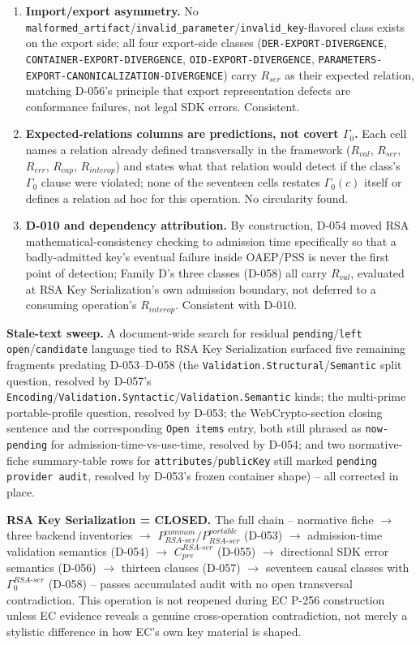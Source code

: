 \documentclass[11pt,a4paper]{article}
\begin{document}
\begin{enumerate}
\item \textbf{Import/export asymmetry.} No \texttt{malformed\_artifact}/\texttt{invalid\_parameter}/\texttt{invalid\_key}-flavored class exists on the export side; all four export-side classes (\texttt{DER-EXPORT-DIVERGENCE}, \texttt{CONTAINER-EXPORT-DIVERGENCE}, \texttt{OID-EXPORT-DIVERGENCE}, \texttt{PARAMETERS-EXPORT-CANONICALIZATION-DIVERGENCE}) carry $R_{ser}$ as their expected relation, matching D-056's principle that export representation defects are conformance failures, not legal SDK errors. Consistent.
\item \textbf{Expected-relations columns are predictions, not covert $\Gamma_0$.} Each cell names a relation already defined transversally in the framework ($R_{val}$, $R_{ser}$, $R_{err}$, $R_{cap}$, $R_{interop}$) and states what that relation would detect if the class's $\Gamma_0$ clause were violated; none of the seventeen cells restates $\Gamma_0(c)$ itself or defines a relation ad hoc for this operation. No circularity found.
\item \textbf{D-010 and dependency attribution.} By construction, D-054 moved RSA mathematical-consistency checking to admission time specifically so that a badly-admitted key's eventual failure inside OAEP/PSS is never the first point of detection; Family D's three classes (D-058) all carry $R_{val}$, evaluated at RSA Key Serialization's own admission boundary, not deferred to a consuming operation's $R_{interop}$. Consistent with D-010.
\end{enumerate}

\textbf{Stale-text sweep.} A document-wide search for residual \texttt{pending}/\texttt{left open}/\texttt{candidate} language tied to RSA Key Serialization surfaced five remaining fragments predating D-053--D-058 (the \texttt{Validation.Structural}/\texttt{Semantic} split question, resolved by D-057's \texttt{Encoding}/\texttt{Validation.Syntactic}/\texttt{Validation.Semantic} kinds; the multi-prime portable-profile question, resolved by D-053; the WebCrypto-section closing sentence and the corresponding \texttt{Open items} entry, both still phrased as \texttt{now-pending} for admission-time-vs-use-time, resolved by D-054; and two normative-fiche summary-table rows for \texttt{attributes}/\texttt{publicKey} still marked \texttt{pending provider audit}, resolved by D-053's frozen container shape) -- all corrected in place.

\textbf{RSA Key Serialization = CLOSED.} The full chain -- normative fiche $\to$ three backend inventories $\to$ $P_{RSA\text{-}ser}^{common}/P_{RSA\text{-}ser}^{portable}$ (D-053) $\to$ admission-time validation semantics (D-054) $\to$ $C_{pre}^{RSA\text{-}ser}$ (D-055) $\to$ directional SDK error semantics (D-056) $\to$ thirteen clauses (D-057) $\to$ seventeen causal classes with $\Gamma_0^{RSA\text{-}ser}$ (D-058) -- passes accumulated audit with no open transversal contradiction. This operation is not reopened during EC P-256 construction unless EC evidence reveals a genuine cross-operation contradiction, not merely a stylistic difference in how EC's own key material is shaped.
\end{document}
